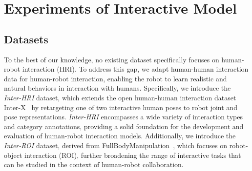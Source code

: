 \section{Experiments of Interactive Model}

\subsection{Datasets} 

To the best of our knowledge, no existing dataset specifically focuses on human-robot interaction (HRI). To address this gap, we adapt human-human interaction data for human-robot interaction, enabling the robot to learn realistic and natural behaviors in interaction with humans. Specifically, we introduce the \textit{Inter-HRI} dataset, which extends the open human-human interaction dataset Inter-X~\cite{xu2024inter} by retargeting one of two interactive human poses to robot joint and pose representations. \textit{Inter-HRI} encompasses a wide variety of interaction types and category annotations, providing a solid foundation for the development and evaluation of human-robot interaction models. Additionally, we introduce the \textit{Inter-ROI} dataset, derived from FullBodyManipulation~\cite{li2023object}, which focuses on robot-object interaction (ROI), further broadening the range of interactive tasks that can be studied in the context of human-robot collaboration.


